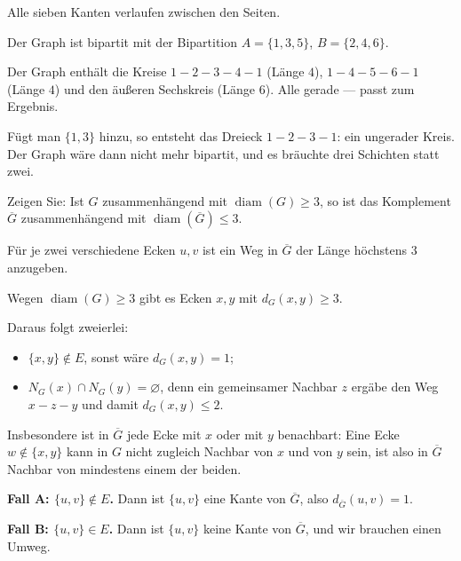 \begin{aufgabe}
Alle sieben Kanten verlaufen zwischen den Seiten.

Der Graph ist bipartit mit der Bipartition $A = \{1,3,5\}$, $B = \{2,4,6\}$.

Der Graph enthält die Kreise $1\!-\!2\!-\!3\!-\!4\!-\!1$ (Länge $4$), $1\!-\!4\!-\!5\!-\!6\!-\!1$ (Länge $4$) und den äußeren Sechskreis (Länge $6$). Alle gerade --- passt zum Ergebnis. \checkmark

Fügt man $\{1,3\}$ hinzu, so entsteht das Dreieck $1\!-\!2\!-\!3\!-\!1$: ein ungerader Kreis. Der Graph wäre dann nicht mehr bipartit, und es bräuchte drei Schichten statt zwei.
\end{aufgabe}

\begin{aufgabe}
Zeigen Sie: Ist $G$ zusammenhängend mit $\operatorname{diam}(G) \ge 3$, so ist das Komplement $\overline{G}$ zusammenhängend mit $\operatorname{diam}(\overline{G}) \le 3$.

\loesung
{}
Für je zwei verschiedene Ecken $u,v$ ist ein Weg in $\overline{G}$ der Länge höchstens $3$ anzugeben.

Wegen $\operatorname{diam}(G) \ge 3$ gibt es Ecken $x, y$ mit $d_G(x,y) \ge 3$.

Daraus folgt zweierlei:
\begin{itemize}[leftmargin=1.4em, itemsep=2pt]
\item $\{x,y\} \notin E$, sonst wäre $d_G(x,y) = 1$;
\item $N_G(x) \cap N_G(y) = \varnothing$, denn ein gemeinsamer Nachbar $z$ ergäbe den Weg $x\!-\!z\!-\!y$ und damit $d_G(x,y) \le 2$.
\end{itemize}
Insbesondere ist in $\overline{G}$ jede Ecke mit $x$ oder mit $y$ benachbart: Eine Ecke $w \notin \{x,y\}$ kann in $G$ nicht zugleich Nachbar von $x$ und von $y$ sein, ist also in $\overline{G}$ Nachbar von mindestens einem der beiden.


\textbf{Fall A: $\{u,v\} \notin E$.} Dann ist $\{u,v\}$ eine Kante von $\overline{G}$, also $d_{\overline{G}}(u,v) = 1$.

\textbf{Fall B: $\{u,v\} \in E$.} Dann ist $\{u,v\}$ keine Kante von $\overline{G}$, und wir brauchen einen Umweg.


\end{aufgabe}

